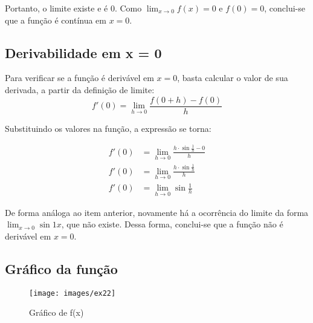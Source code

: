 \documentclass[../resumo.tex]{subfiles}
\begin{document}
	Portanto, o limite existe e é 0. Como $\lim_{x\to0}f(x) = 0$ e $f(0) = 0$, conclui-se que a função
	é contínua em $x = 0$.

	\subsection{Derivabilidade em x = 0}

	Para verificar se a função é derivável em $x = 0$, basta calcular o valor de sua derivada, a partir
	da definição de limite:
	\[f'(0) = \lim_{h\to0} \frac{f(0 + h) - f(0)}{h}\]

	Substituindo os valores na função, a expressão se torna:

	\begin{align*}
			f'(0) &= \lim_{h\to0} \frac{h\cdot\sin{\frac{1}{h}} - 0}{h} \\
			f'(0) &= \lim_{h\to0} \frac{h\cdot\sin{\frac{1}{h}}}{h} \\
			f'(0) &= \lim_{h\to0}\sin{\frac{1}{h}}
	\end{align*}

	De forma análoga ao item anterior, novamente há a ocorrência do limite da forma $\lim_{x\to0} \sin{1}{x}$,
	que não existe. Dessa forma, conclui-se que a função não é derivável em $x = 0$.

	\subsection{Gráfico da função}

	\begin{figure}[H]
			\centering
			\texttt{[image: images/ex22]}
			\caption{Gráfico de f(x)}
	\end{figure}
\end{document}
